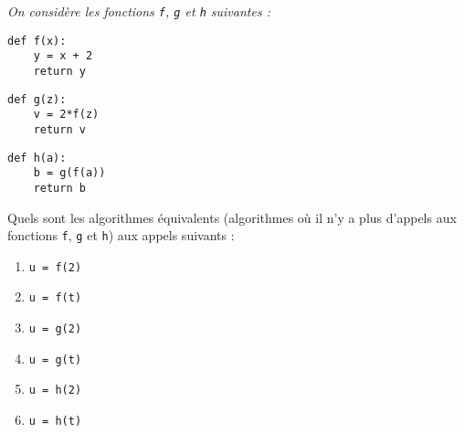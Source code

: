 \begin{td}\label{td:passage}
\em
On considère les fonctions {\tt f}, {\tt g} et {\tt h} suivantes :

\begin{center}
\begin{py}{4cm}
\begin{verbatim}
def f(x):
    y = x + 2
    return y
\end{verbatim}
\end{py}\hspace*{1cm}
\begin{py}{4cm}
\begin{verbatim}
def g(z):
    v = 2*f(z)
    return v
\end{verbatim}
\end{py}\hspace*{1cm}
\begin{py}{4cm}
\begin{verbatim}
def h(a):
    b = g(f(a))
    return b
\end{verbatim}
\end{py}
\end{center}

Quels sont les algorithmes équivalents (algorithmes où il n'y a plus 
d'appels aux fonctions {\tt f}, {\tt g} et {\tt h}) aux appels suivants :
\vspace*{2mm}

\begin{minipage}{4cm}
\begin{enumerate}
\item {\tt u = f(2)}
\item {\tt u = f(t)}
\end{enumerate}
\end{minipage}\hfill
\begin{minipage}{4cm}
\begin{enumerate}\setcounter{enumi}{2}
\item {\tt u = g(2)}
\item {\tt u = g(t)}
\end{enumerate}
\end{minipage}\hfill
\begin{minipage}{4cm}
\begin{enumerate}\setcounter{enumi}{4}
\item {\tt u = h(2)}
\item {\tt u = h(t)}
\end{enumerate}
\end{minipage}

\end{td}

